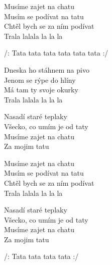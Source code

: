 
\ve{}
Musíme zajet na chatu\\
Musím se podívat na tatu\\
Chtěl bych se za ním podívat\\
Trala lalala la la la

\re{}
/: Tata tata tata tata tata tata :/

\ve{}
Dneska ho stáhnem na pivo\\
Jenom se rýpe do hlíny\\
Má tam ty svoje okurky\\
Trala lalala la la la

\ve{}
Nasadí staré teplaky\\
Všecko, co umím je od taty\\
Musíme zajet na chatu\\
Za mojim tatu

\ve{}
Musíme zajet na chatu\\
Musím se podívat na tatu\\
Chtěl bych se za ním podívat\\
Trala lalala la la la

\ve{}
Nasadí staré teplaky\\
Všecko, co umím je od taty\\
Musíme zajet na chatu\\
Za mojim tatu

\re{}
/: Tata tata tata tata :/


\esong{}